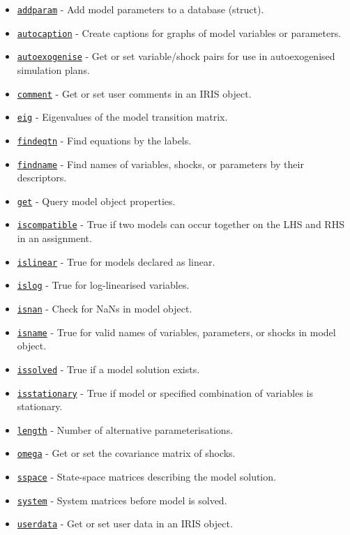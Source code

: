 \begin{itemize}
\itemsep1pt\parskip0pt
\item
  \href{model/addparam}{\texttt{addparam}} - Add model parameters to a
  database (struct).
\item
  \href{model/autocaption}{\texttt{autocaption}} - Create captions for
  graphs of model variables or parameters.
\item
  \href{model/autoexogenise}{\texttt{autoexogenise}} - Get or set
  variable/shock pairs for use in autoexogenised simulation plans.
\item
  \href{model/comment}{\texttt{comment}} - Get or set user comments in
  an IRIS object.
\item
  \href{model/eig}{\texttt{eig}} - Eigenvalues of the model transition
  matrix.
\item
  \href{model/findeqtn}{\texttt{findeqtn}} - Find equations by the
  labels.
\item
  \href{model/findname}{\texttt{findname}} - Find names of variables,
  shocks, or parameters by their descriptors.
\item
  \href{model/get}{\texttt{get}} - Query model object properties.
\item
  \href{model/iscompatible}{\texttt{iscompatible}} - True if two models
  can occur together on the LHS and RHS in an assignment.
\item
  \href{model/islinear}{\texttt{islinear}} - True for models declared as
  linear.
\item
  \href{model/islog}{\texttt{islog}} - True for log-linearised
  variables.
\item
  \href{model/isnan}{\texttt{isnan}} - Check for NaNs in model object.
\item
  \href{model/isname}{\texttt{isname}} - True for valid names of
  variables, parameters, or shocks in model object.
\item
  \href{model/issolved}{\texttt{issolved}} - True if a model solution
  exists.
\item
  \href{model/isstationary}{\texttt{isstationary}} - True if model or
  specified combination of variables is stationary.
\item
  \href{model/length}{\texttt{length}} - Number of alternative
  parameterisations.
\item
  \href{model/omega}{\texttt{omega}} - Get or set the covariance matrix
  of shocks.
\item
  \href{model/sspace}{\texttt{sspace}} - State-space matrices describing
  the model solution.
\item
  \href{model/system}{\texttt{system}} - System matrices before model is
  solved.
\item
  \href{model/userdata}{\texttt{userdata}} - Get or set user data in an
  IRIS object.
\end{itemize}

